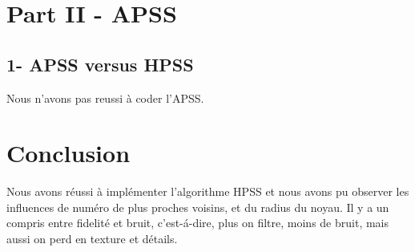 \documentclass[a4,12pt]{report}
\begin{document}
\section*{Part II - APSS}
\subsection*{1- APSS versus HPSS} 
Nous n'avons pas reussi à coder l'APSS.


\section*{Conclusion}
Nous avons réussi à implémenter l'algorithme HPSS et nous avons pu observer les influences de numéro de plus proches voisins, et du radius du noyau. Il y a un compris entre fidelité et bruit, c'est-á-dire, plus on filtre, moins de bruit, mais aussi on perd en texture et détails.
\end{document}
